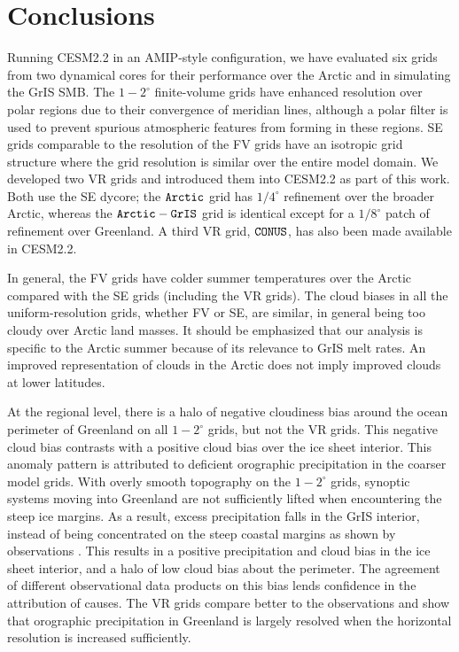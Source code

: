 \documentclass[draft]{agujournal2019}
\begin{document}
\section{Conclusions}\label{sec:conclusions}

Running CESM2.2 in an AMIP-style configuration, we have evaluated six grids from two dynamical cores for their performance over the Arctic and in simulating the GrIS SMB. The $1-2^{\circ}$ finite-volume grids have enhanced resolution over polar regions due to their convergence of meridian lines, although a polar filter is used to prevent spurious atmospheric features from forming in these regions. SE grids comparable to the resolution of the FV grids have an isotropic grid structure where the grid resolution is similar over the entire model domain. We developed two VR grids and introduced them into CESM2.2 as part of this work. Both use the SE dycore; the $\tt Arctic$ grid has $1/4^{\circ}$ refinement over the broader Arctic, whereas the $\tt Arctic-GrIS$ grid is identical except for a $1/8^{\circ}$ patch of refinement over Greenland. A third VR grid, $\tt CONUS$, has also been made available in CESM2.2.

In general, the FV grids have colder summer temperatures over the Arctic compared with the SE grids (including the VR grids). The cloud biases in all the uniform-resolution grids, whether FV or SE, are similar, in general being too cloudy over Arctic land masses. It should be emphasized that our analysis is specific to the Arctic summer because of its relevance to GrIS melt rates. An improved representation of clouds in the Arctic does not imply improved clouds at lower latitudes.

At the regional level, there is a halo of negative cloudiness bias around the ocean perimeter of Greenland on all $1-2^{\circ}$ grids, but not the VR grids. This negative cloud bias contrasts with a positive cloud bias over the ice sheet interior. This anomaly pattern is attributed to deficient orographic precipitation in the coarser model grids.  With overly smooth topography on the $1-2^{\circ}$ grids, synoptic systems moving into Greenland are not sufficiently lifted when encountering the steep ice margins. As a result, excess precipitation falls in the GrIS interior, instead of being concentrated on the steep coastal margins as shown by observations \cite{P2000GPC,VETAL2018TC}. This results in a positive precipitation and cloud bias in the ice sheet interior, and a halo of low cloud bias about the perimeter. The agreement of different observational data products on this bias lends confidence in the attribution of causes. The VR grids compare better to the observations and show that orographic precipitation in Greenland is largely resolved when the horizontal resolution is increased sufficiently.
\end{document}
